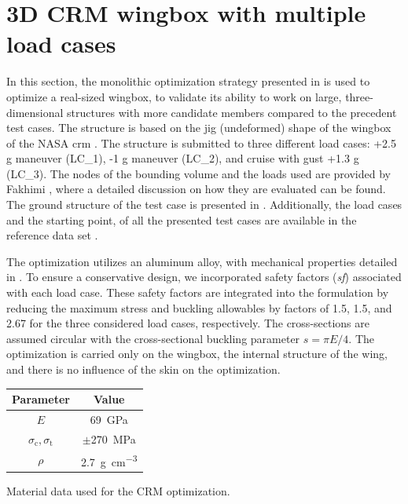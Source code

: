 \section{3D CRM wingbox with multiple load cases}
In this section, the monolithic optimization strategy presented in  is used to optimize a real-sized wingbox, to validate its ability to work on large, three-dimensional structures with more candidate members compared to the precedent test cases. The structure is based on the jig (undeformed) shape of the wingbox of the NASA \gls{crm} . The structure is submitted to three different load cases: +2.5 g maneuver (LC\_1), -1 g maneuver (LC\_2), and cruise with gust +1.3 g (LC\_3). The nodes of the bounding volume and the loads used are provided by Fakhimi \etal {}, where a detailed discussion on how they are evaluated can be found. The ground structure of the test case is presented in . Additionally, the load cases and the starting point, of all the presented test cases are available in the reference data set .

The optimization utilizes an aluminum alloy, with mechanical properties detailed in . To ensure a conservative design, we incorporated safety factors (\textit{sf}) associated with each load case. These safety factors are integrated into the formulation by reducing the maximum stress and buckling allowables by factors of 1.5, 1.5, and 2.67 for the three considered load cases, respectively. The cross-sections are assumed circular with the cross-sectional buckling parameter $s = \pi E/4$. The optimization is carried only on the wingbox, the internal structure of the wing, and there is no influence of the skin on the optimization.
\begin{margintable}
    \small
    \centering
    \begin{tabular}{cc}
    \toprule
    \textbf{Parameter}        & \textbf{Value} \\ \midrule
    $E$              & \qty{69}{GPa}     \\
    $\sigma_\text{c}, \sigma_\text{t}$ & $\pm $\qty{270}{MPa} \\
    $\rho$              & \qty{2.7}{\gram\per\cubic\centi\metre}   \\
    \bottomrule
    \end{tabular}
    \caption{Material data used for the CRM optimization.}
    \label{tab:07_CRM_mat}
\end{margintable}

